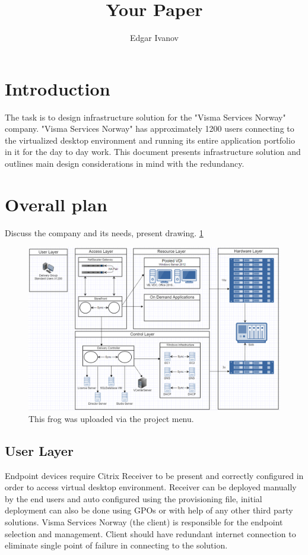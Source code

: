 \documentclass[a4paper]{article}
\title{Your Paper}
\author{Edgar Ivanov}
\begin{document}
	\maketitle
	
	
	
	\section{Introduction}
	
	The task is to design infrastructure solution for the "Visma Services Norway" company. "Visma Services Norway" has approximately 1200 users connecting to the virtualized desktop environment and running its entire application portfolio in it for the day to day work. This document presents infrastructure solution and outlines main design considerations in mind with the redundancy.
	
	\section{Overall plan}
	Discuss the company and its needs, present drawing. \ref{fig:frog} 
	
	\begin{figure}
		\centering
		\includegraphics[width=1\textwidth]{Diagram.png}
		\caption{\label{fig:frog}This frog was uploaded via the project menu.}
	\end{figure}
	
	\subsection{User Layer}
	Endpoint devices require Citrix Receiver to be present and correctly configured in order to access virtual desktop environment. Receiver can be deployed manually by the end users and auto configured using the provisioning file, initial deployment can also be done using GPOs or with help of any other third party solutions. Visma Services Norway (the client) is responsible for the endpoint selection and management. Client should have redundant internet connection to eliminate single point of failure in connecting to the solution.
\end{document}
